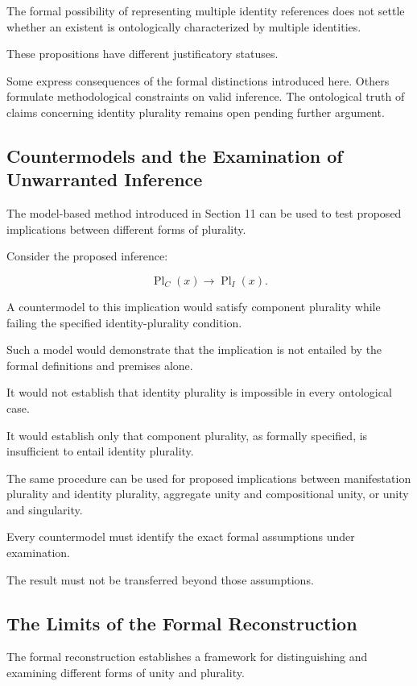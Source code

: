 The formal possibility of
representing multiple identity
references does not settle
whether an existent is
ontologically characterized
by multiple identities.

These propositions have different
justificatory statuses.

Some express consequences of
the formal distinctions introduced
here. Others formulate methodological
constraints on valid inference.
The ontological truth of claims
concerning identity plurality
remains open pending further
argument.

\subsection{Countermodels and the Examination of Unwarranted Inference}

The model-based method introduced
in Section 11 can be used to
test proposed implications
between different forms of
plurality.

Consider the proposed inference:

\[
    \operatorname{Pl}_{C}(x)
    \rightarrow
    \operatorname{Pl}_{I}(x).
\]

A countermodel to this implication
would satisfy component plurality
while failing the specified
identity-plurality condition.

Such a model would demonstrate
that the implication is not
entailed by the formal definitions
and premises alone.

It would not establish that
identity plurality is impossible
in every ontological case.

It would establish only that
component plurality, as formally
specified, is insufficient to
entail identity plurality.

The same procedure can be used
for proposed implications between
manifestation plurality and
identity plurality, aggregate
unity and compositional unity,
or unity and singularity.

Every countermodel must identify
the exact formal assumptions
under examination.

The result must not be transferred
beyond those assumptions.

\subsection{The Limits of the Formal Reconstruction}

The formal reconstruction
establishes a framework for
distinguishing and examining
different forms of unity and
plurality.

